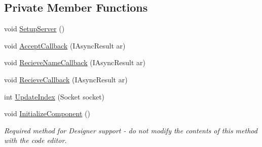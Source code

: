 \subsection*{Private Member Functions}
\begin{DoxyCompactItemize}
\item 
void \hyperlink{class_socket_server_1_1_socket_server_a7f3eb3d21566ae27786debe88c434cab}{Setup\+Server} ()
\item 
void \hyperlink{class_socket_server_1_1_socket_server_addf45af964dc6d234b98c719eb7d7a6e}{Accept\+Callback} (I\+Async\+Result ar)
\item 
void \hyperlink{class_socket_server_1_1_socket_server_a03c9fa5afc778edc51344fe0b05730c8}{Recieve\+Name\+Callback} (I\+Async\+Result ar)
\item 
void \hyperlink{class_socket_server_1_1_socket_server_abc93c9ce76d2cc65a209b5144f4bcc74}{Recieve\+Callback} (I\+Async\+Result ar)
\item 
int \hyperlink{class_socket_server_1_1_socket_server_a927514acb2fcf8804b360ad07b677a53}{Update\+Index} (Socket socket)
\item 
void \hyperlink{class_socket_server_1_1_socket_server_a19cb5f0314ec00e0837a893f079bf78d}{Initialize\+Component} ()
\begin{DoxyCompactList}\small\item\em Required method for Designer support -\/ do not modify the contents of this method with the code editor. \end{DoxyCompactList}\end{DoxyCompactItemize}
